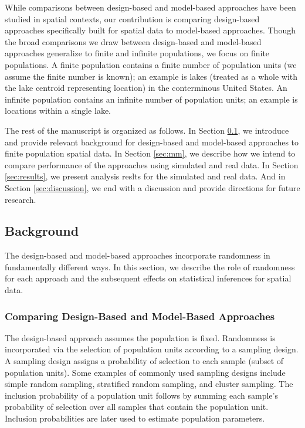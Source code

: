 \documentclass[]{elsarticle} %
\begin{document}
While comparisons between design-based and model-based approaches have
been studied in spatial contexts, our contribution is comparing
design-based approaches specifically built for spatial data to
model-based approaches. Though the broad comparisons we draw between
design-based and model-based approaches generalize to finite and
infinite populations, we focus on finite populations. A finite
population contains a finite number of population units (we assume the
finite number is known); an example is lakes (treated as a whole with
the lake centroid representing location) in the conterminous United
States. An infinite population contains an infinite number of population
units; an example is locations within a single lake.

The rest of the manuscript is organized as follows. In Section
\ref{sec:background}, we introduce and provide relevant background for
design-based and model-based approaches to finite population spatial
data. In Section \ref{sec:mm}, we describe how we intend to compare
performance of the approaches using simulated and real data. In Section
\ref{sec:results}, we present analysis reslts for the simulated and real
data. And in Section \ref{sec:discussion}, we end with a discussion and
provide directions for future research.

\hypertarget{sec:background}{%
\subsection{Background}\label{sec:background}}

The design-based and model-based approaches incorporate randomness in
fundamentally different ways. In this section, we describe the role of
randomness for each approach and the subsequent effects on statistical
inferences for spatial data.

\hypertarget{subsec:dvm_compare}{%
\subsubsection{Comparing Design-Based and Model-Based
Approaches}\label{subsec:dvm_compare}}

The design-based approach assumes the population is fixed. Randomness is
incorporated via the selection of population units according to a
sampling design. A sampling design assigns a probability of selection to
each sample (subset of population units). Some examples of commonly used
sampling designs include simple random sampling, stratified random
sampling, and cluster sampling. The inclusion probability of a
population unit follows by summing each sample's probability of
selection over all samples that contain the population unit. Inclusion
probabilities are later used to estimate population parameters.
\end{document}
